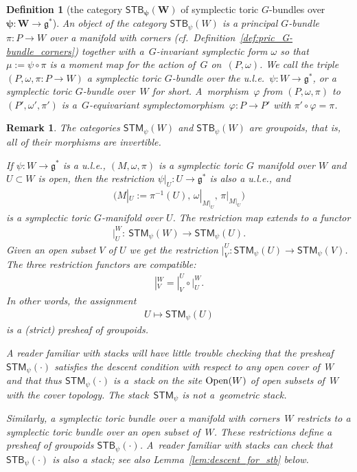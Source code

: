 \documentclass[pdftex]{sigma}
\numberwithin{equation}{section}
\newtheorem{Definition}[Lemma]{Definition}
\newtheorem{Remark}[Lemma]{Remark}
\begin{document}
\begin{Definition}[the category $\mathbf{{\textsf{STB}}_\psi (W)}$ of symplectic toric
  $G$-bundles over $\mathbf{\psi\colon W\to {\mathfrak g}^*}$] \label{def:STB}
  An  \emph{object} of the category ${\textsf{STB}}_\psi (W)$ is a principal
  $G$-bundle $\pi\colon P\to W$ over a manifold with corners (cf.\
  Def\/inition~\ref{def:pric_G-bundle_corners}) together with a~$G$-invariant symplectic form $\omega$ so that $\mu := \psi \circ
  \pi$ is a moment map for the action of~$G$ on~$(P,\omega)$.
  We call the triple $(P,\omega, \pi\colon  P \to W)$
  a {\em symplectic toric $G$-bundle over the u.l.e.\ $\psi\colon  W\to {\mathfrak g}^*$},
  or a symplectic toric $G$-bundle over~$W$ for short.
  A~\emph{morphism}~$\varphi$ from $(P, \omega, \pi)$ to
  $(P', \omega', \pi')$ is a~$G$-equivariant
  symplectomorphism~$\varphi \colon P \to P'$ with $\pi' \circ
  \varphi = \pi$.
\end{Definition}

\begin{Remark}
 The categories ${\textsf{STM}}_\psi(W)$ and ${\textsf{STB}}_\psi(W)$
are groupoids, that is, all of their morphisms are invertible.


  If $\psi \colon W\to {\mathfrak g}^*$ is a u.l.e., $(M,\omega, \pi)$ is a symplectic
  toric $G$ manifold over $W$ and $U\subset W$ is open, then the restriction
  $\psi|_U\colon U \to {\mathfrak g}^*$ is also a u.l.e., and
\begin{gather*}
\big(M|_U:= \pi^{-1} (U),\, \omega|_{M|_U},\, \pi|_{M|_U}\big)
\end{gather*}
is a symplectic toric $G$-manifold over $U$.
The restriction map extends to a functor
\begin{gather*}
|^W_U\colon \  {\textsf{STM}}_\psi (W) \to {\textsf{STM}}_\psi(U).
\end{gather*}
Given an open subset $V$ of $U$ we get the restriction $|_V^U\colon
{\textsf{STM}}_\psi(U)\to {\textsf{STM}}_\psi(V)$.  The three restriction functors are
compatible:
\begin{gather*}
|^W_V = |^U_V \circ |^W_U.
\end{gather*}
In other words, the assignment
\begin{gather*}
U\mapsto {\textsf{STM}}_\psi (U)
\end{gather*}
is a (strict) presheaf of groupoids.

A reader familiar with stacks will have little trouble checking that
the presheaf ${\textsf{STM}}_\psi (\cdot)$ satisf\/ies the descent condition with
respect to any open cover of~$W$ and that thus ${\textsf{STM}}_\psi (\cdot )$ is
a~stack on the site ${\rm Open}(W)$ of open subsets of~$W$ with the cover
topology.  The stack~${\textsf{STM}}_\psi $ is not a~geometric stack.

Similarly, a symplectic toric bundle over a
manifold with corners~$W$ restricts to a symplectic toric bundle over
an open subset of~$W$.  These restrictions def\/ine a presheaf of
groupoids ${\textsf{STB}}_\psi (\cdot )$.  A~reader familiar with stacks can
check that ${\textsf{STB}}_\psi (\cdot )$ is also a stack; see also
Lemma~\ref{lem:descent_for_stb} below.
\end{Remark}
\end{document}
